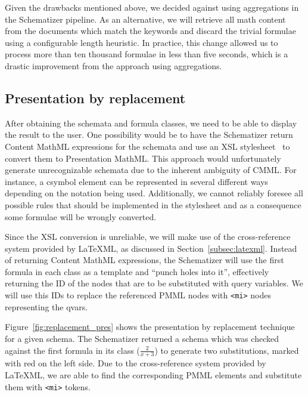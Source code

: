 \documentclass[a4paper,oneside]{article}
\def\cmml{\textsf{Content MathML}\xspace}
\def\pmml{\textsf{Presentation MathML}\xspace}
\def\latexml{\LaTeX{ML}\xspace}
\begin{document}
Given the drawbacks mentioned above, we decided against using aggregations in
the Schematizer pipeline. As an alternative, we will retrieve all math content
from the documents which match the keywords and discard the trivial formulae
using a configurable length heuristic. In practice, this change allowed us to
process more than ten thousand formulae in less than five seconds, which is a
drastic improvement from the approach using aggregations.

\subsection{Presentation by replacement}\label{subsec:make_sch_recog}
After obtaining the schemata and formula classes, we need to be able to display
the result to the user. One possibility would be to have the Schematizer return
\cmml expressions for the schemata and use an XSL
stylesheet~\cite{carlisle:online} to convert them to \pmml. This approach
would unfortunately generate unrecognizable schemata due to the inherent
ambiguity of CMML. For instance, a \textsf{csymbol} element can be
represented in several different ways depending on the notation being used.
Additionally, we cannot reliably foresee all possible rules that should be
implemented in the stylesheet and as a consequence some formulae will be
wrongly converted.

Since the XSL conversion is unreliable, we will make use of the cross-reference
system provided by \latexml, as discussed in Section~\ref{subsec:latexml}.
Instead of returning \cmml expressions, the Schematizer will use the first
formula in each class as a template and ``punch holes into it'', effectively
returning the ID of the nodes that are to be substituted with query variables.
We will use this IDs to replace the referenced PMML nodes with \verb|<mi>|
nodes representing the qvars.

Figure~\ref{fig:replacement_pres} shows the presentation by replacement
technique for a given schema. The Schematizer returned a schema which was
checked against the first formula in its class ($\frac{2}{x+3}$) to generate
two substitutions, marked with red on the left side. Due to the cross-reference
system provided by \latexml, we are able to find the corresponding PMML
elements and substitute them with \verb|<mi>| tokens.
\end{document}
